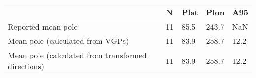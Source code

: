 \begin{tabular}{lllll}
\toprule
{} &   N &  Plat &   Plon &   A95 \\
\midrule
Reported mean pole                                 &  11 &  85.5 &  243.7 &   NaN \\
Mean pole (calculated from VGPs)                   &  11 &  83.9 &  258.7 &  12.2 \\
Mean pole (calculated from transformed directions) &  11 &  83.9 &  258.7 &  12.2 \\
\bottomrule
\end{tabular}
